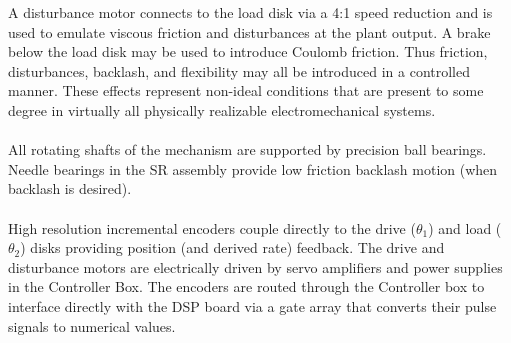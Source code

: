 \documentclass[11pt, a4paper]{article}
\begin{document}
A disturbance motor connects to the load disk via a 4:1 speed reduction and is used to emulate viscous friction and disturbances at the plant output. A brake below the load disk may be used to introduce Coulomb friction. Thus friction, disturbances, backlash, and flexibility may all be introduced in a controlled manner. These effects represent non-ideal conditions that are present to some degree in virtually all physically realizable electromechanical systems. \\ \\
All rotating shafts of the mechanism are supported by precision ball bearings. Needle bearings in the SR assembly provide low friction backlash motion (when backlash is desired). \\ \\
High resolution incremental encoders couple directly to the drive ($\theta_1$) and load ($\theta_2$) disks providing position (and derived rate) feedback. The drive and disturbance motors are electrically driven by servo amplifiers and power supplies in the Controller Box. The encoders are routed through the Controller box to interface directly with the DSP board via a gate array that converts their pulse signals to numerical values.
\end{document}
